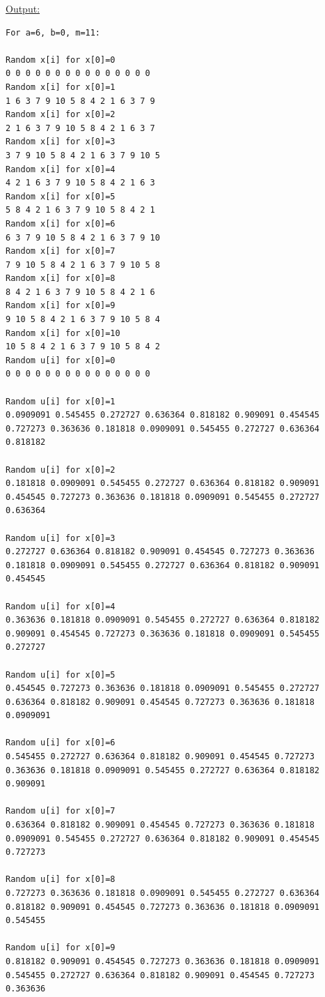 \documentclass[11pt]{article}
\begin{document}
\underline{Output:}
\begin{lstlisting}
For a=6, b=0, m=11:

Random x[i] for x[0]=0
0 0 0 0 0 0 0 0 0 0 0 0 0 0 0 
Random x[i] for x[0]=1
1 6 3 7 9 10 5 8 4 2 1 6 3 7 9 
Random x[i] for x[0]=2
2 1 6 3 7 9 10 5 8 4 2 1 6 3 7 
Random x[i] for x[0]=3
3 7 9 10 5 8 4 2 1 6 3 7 9 10 5 
Random x[i] for x[0]=4
4 2 1 6 3 7 9 10 5 8 4 2 1 6 3 
Random x[i] for x[0]=5
5 8 4 2 1 6 3 7 9 10 5 8 4 2 1 
Random x[i] for x[0]=6
6 3 7 9 10 5 8 4 2 1 6 3 7 9 10 
Random x[i] for x[0]=7
7 9 10 5 8 4 2 1 6 3 7 9 10 5 8 
Random x[i] for x[0]=8
8 4 2 1 6 3 7 9 10 5 8 4 2 1 6 
Random x[i] for x[0]=9
9 10 5 8 4 2 1 6 3 7 9 10 5 8 4 
Random x[i] for x[0]=10
10 5 8 4 2 1 6 3 7 9 10 5 8 4 2 
Random u[i] for x[0]=0
0 0 0 0 0 0 0 0 0 0 0 0 0 0 0 

Random u[i] for x[0]=1
0.0909091 0.545455 0.272727 0.636364 0.818182 0.909091 0.454545 0.727273 0.363636 0.181818 0.0909091 0.545455 0.272727 0.636364 0.818182 

Random u[i] for x[0]=2
0.181818 0.0909091 0.545455 0.272727 0.636364 0.818182 0.909091 0.454545 0.727273 0.363636 0.181818 0.0909091 0.545455 0.272727 0.636364 

Random u[i] for x[0]=3
0.272727 0.636364 0.818182 0.909091 0.454545 0.727273 0.363636 0.181818 0.0909091 0.545455 0.272727 0.636364 0.818182 0.909091 0.454545 

Random u[i] for x[0]=4
0.363636 0.181818 0.0909091 0.545455 0.272727 0.636364 0.818182 0.909091 0.454545 0.727273 0.363636 0.181818 0.0909091 0.545455 0.272727 

Random u[i] for x[0]=5
0.454545 0.727273 0.363636 0.181818 0.0909091 0.545455 0.272727 0.636364 0.818182 0.909091 0.454545 0.727273 0.363636 0.181818 0.0909091 

Random u[i] for x[0]=6
0.545455 0.272727 0.636364 0.818182 0.909091 0.454545 0.727273 0.363636 0.181818 0.0909091 0.545455 0.272727 0.636364 0.818182 0.909091 

Random u[i] for x[0]=7
0.636364 0.818182 0.909091 0.454545 0.727273 0.363636 0.181818 0.0909091 0.545455 0.272727 0.636364 0.818182 0.909091 0.454545 0.727273 

Random u[i] for x[0]=8
0.727273 0.363636 0.181818 0.0909091 0.545455 0.272727 0.636364 0.818182 0.909091 0.454545 0.727273 0.363636 0.181818 0.0909091 0.545455 

Random u[i] for x[0]=9
0.818182 0.909091 0.454545 0.727273 0.363636 0.181818 0.0909091 0.545455 0.272727 0.636364 0.818182 0.909091 0.454545 0.727273 0.363636 


\end{lstlisting}
\end{document}

